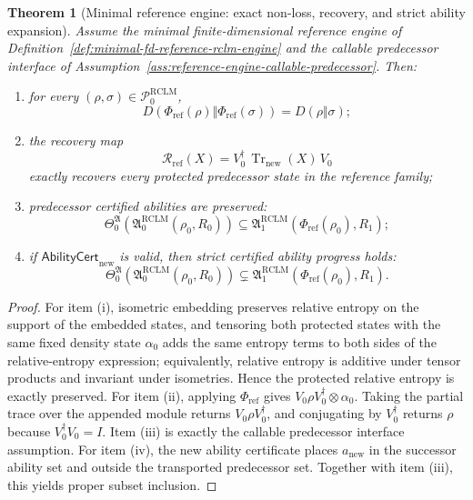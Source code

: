 \documentclass[11pt,a4paper]{article}
\newtheorem{theorem}{Theorem}[section]
\newcommand{\Pcal}{\mathcal P}
\newcommand{\Tr}{\operatorname{Tr}}
\newcommand{\RCLM}{\mathrm{RCLM}}
\begin{document}
\begin{theorem}[Minimal reference engine: exact non-loss, recovery, and strict ability expansion]
\label{thm:minimal-reference-engine-nonloss-recovery-progress}
Assume the minimal finite-dimensional reference engine of Definition~\ref{def:minimal-fd-reference-rclm-engine} and the callable predecessor interface of Assumption~\ref{ass:reference-engine-callable-predecessor}.  Then:
\begin{enumerate}[label=(\roman*),leftmargin=1.5em]
    \item for every \((\rho,\sigma)\in\Pcal_0^{\RCLM}\),
    \[
    D(\Phi_{\mathrm{ref}}(\rho)\Vert\Phi_{\mathrm{ref}}(\sigma))
    =
    D(\rho\Vert\sigma);
    \]
    \item the recovery map
    \[
    \mathcal R_{\mathrm{ref}}(X)
    =
    V_0^\dagger\,\Tr_{\mathrm{new}}(X)\,V_0
    \]
    exactly recovers every protected predecessor state in the reference family;
    \item predecessor certified abilities are preserved:
    \[
    \Theta_0^{\mathfrak A}
    (\mathfrak A_0^{\RCLM}(\rho_0,R_0))
    \subseteq
    \mathfrak A_1^{\RCLM}(\Phi_{\mathrm{ref}}(\rho_0),R_1);
    \]
    \item if \(\mathsf{AbilityCert}_{\mathrm{new}}\) is valid, then strict certified ability progress holds:
    \[
    \Theta_0^{\mathfrak A}
    (\mathfrak A_0^{\RCLM}(\rho_0,R_0))
    \subsetneq
    \mathfrak A_1^{\RCLM}(\Phi_{\mathrm{ref}}(\rho_0),R_1).
    \]
\end{enumerate}
\end{theorem}

\begin{proof}
For item (i), isometric embedding preserves relative entropy on the support of the embedded states, and tensoring both protected states with the same fixed density state \(\alpha_0\) adds the same entropy terms to both sides of the relative-entropy expression; equivalently, relative entropy is additive under tensor products and invariant under isometries.  Hence the protected relative entropy is exactly preserved.  For item (ii), applying \(\Phi_{\mathrm{ref}}\) gives \(V_0\rho V_0^\dagger\otimes\alpha_0\).  Taking the partial trace over the appended module returns \(V_0\rho V_0^\dagger\), and conjugating by \(V_0^\dagger\) returns \(\rho\) because \(V_0^\dagger V_0=I\).  Item (iii) is exactly the callable predecessor interface assumption.  For item (iv), the new ability certificate places \(a_{\mathrm{new}}\) in the successor ability set and outside the transported predecessor set.  Together with item (iii), this yields proper subset inclusion.
\end{proof}
\end{document}
